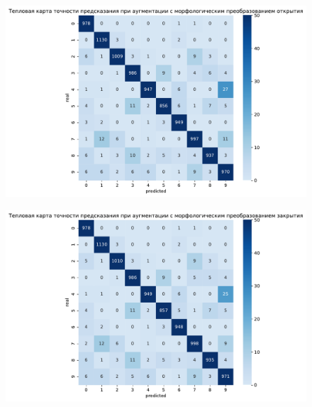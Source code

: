 \documentclass{article}
\begin{document}
\newpage
\begin{figure}[H]	
	\subfigure
	{
        \begin{minipage}{8cm}
            \centering
            \includegraphics[scale=0.33]{TASK1 warm map open.pdf}
        \end{minipage}
        \label{app:open}
	}
	\subfigure
	{
		\begin{minipage}{8cm}
			\centering
			\includegraphics[scale=0.33]{TASK1 warm map close.pdf}
		\end{minipage}
		\label{app:close}
	}
	\subfigure
	{
		\begin{minipage}{8cm}
			\centering

\end{minipage}}
\end{figure}
\end{document}
